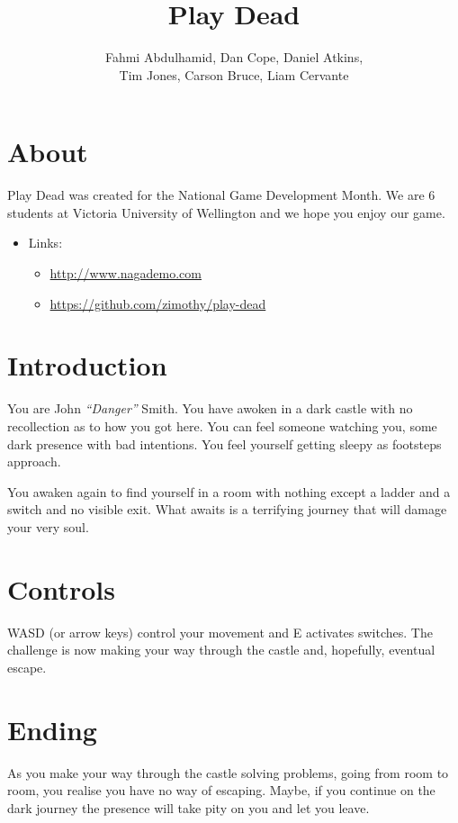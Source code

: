 \documentclass{article}
\title{Play Dead}
\author{Fahmi Abdulhamid, Dan Cope, Daniel Atkins,\\Tim Jones, Carson Bruce, Liam Cervante}
\begin{document}
 \maketitle
 
 \section{About}Play Dead was created for the National Game Development Month. We are 6 students at Victoria University of Wellington and we hope you enjoy our game.
 \begin{itemize}
  \item Links:
  \begin{itemize}
   \item \url{http://www.nagademo.com}
   \item \url{https://github.com/zimothy/play-dead}
  \end{itemize}
 \end{itemize}
 
 \section{Introduction}
 
 You are John \emph{``Danger''} Smith. You have awoken in a dark castle with no recollection as to how you got here. You can feel someone watching you, some dark presence with bad intentions. You feel yourself getting sleepy as footsteps approach.
 
 You awaken again to find yourself in a room with nothing except a ladder and a switch and no visible exit. What awaits is a terrifying journey that will damage your very soul.
 
 \section{Controls}
 
 WASD (or arrow keys) control your movement and E activates switches. The challenge is now making your way through the castle and, hopefully, eventual escape.
 
 \section{Ending}
 
 As you make your way through the castle solving problems, going from room to room, you realise you have no way of escaping. Maybe, if you continue on the dark journey the presence will take pity on you and let you leave.
 
\end{document}
